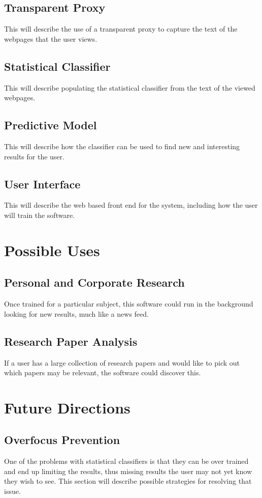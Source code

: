 \documentclass[12pt]{article}
\begin{document}
\subsection{Transparent Proxy}
This will describe the use of a transparent proxy to capture the text
of the webpages that the user views.
\subsection{Statistical Classifier}
This will describe populating the statistical classifier from the text
of the viewed webpages.
\subsection{Predictive Model}
This will describe how the classifier can be used to find new and
interesting results for the user.
\subsection{User Interface}
This will describe the web based front end for the system, including
how the user will train the software.
\section{Possible Uses}
\subsection{Personal and Corporate Research}
Once trained for a particular subject, this software could run in the
background looking for new results, much like a news feed.
\subsection{Research Paper Analysis}
If a user has a large collection of research papers and would like to
pick out which papers may be relevant, the software could discover this.
\section{Future Directions}
\subsection{Overfocus Prevention}
One of the problems with statistical classifiers is that they can be
over trained and end up limiting the results, thus missing results the
user may not yet know they wish to see.
This section will describe possible strategies for resolving that
issue.
\end{document}
